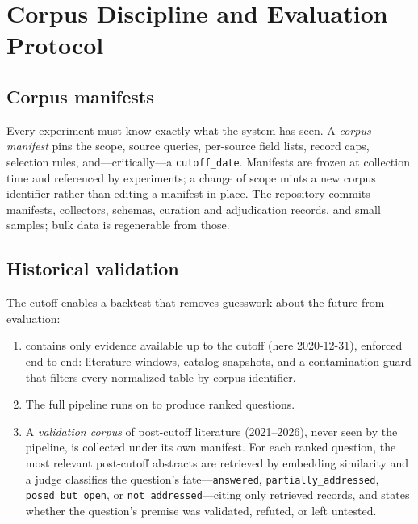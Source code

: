 \section{Corpus Discipline and Evaluation Protocol}
\label{sec:benchmark}

\subsection{Corpus manifests}

Every experiment must know exactly what the system has seen. A
\emph{corpus manifest} pins the scope, source queries, per-source field
lists, record caps, selection rules, and---critically---a
\texttt{cutoff\_date}. Manifests are frozen at collection time and
referenced by experiments; a change of scope mints a new corpus
identifier rather than editing a manifest in place. The repository
commits manifests, collectors, schemas, curation and adjudication
records, and small samples; bulk data is regenerable from those.

\subsection{Historical validation}
\label{sec:benchmark:validation}

The cutoff enables a backtest that removes guesswork about the future
from evaluation:

\begin{enumerate}
  \item \corpusA{} contains only evidence available up to the cutoff
    (here 2020-12-31), enforced end to end: literature windows, catalog
    snapshots, and a contamination guard that filters every normalized
    table by corpus identifier.
  \item The full pipeline runs on \corpusA{} to produce ranked
    questions.
  \item A \emph{validation corpus} of post-cutoff literature
    (2021--2026), never seen by the pipeline, is collected under its own
    manifest. For each ranked question, the most relevant post-cutoff
    abstracts are retrieved by embedding similarity and a judge
    classifies the question's fate---\texttt{answered},
    \texttt{partially\_addressed}, \texttt{posed\_but\_open}, or
    \texttt{not\_addressed}---citing only retrieved records, and states
    whether the question's premise was validated, refuted, or left
    untested.
\end{enumerate}

